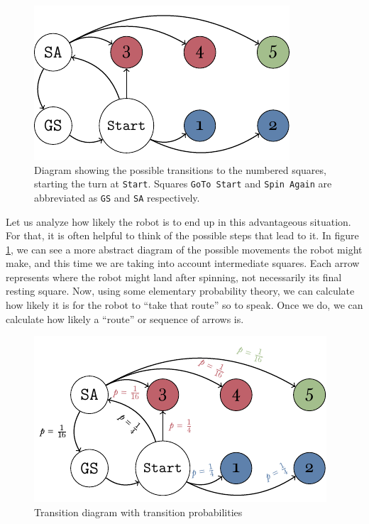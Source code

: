 \begin{figure}
\centering
\includegraphics[width=\textwidth]{img/transicion.pdf}
\caption{Diagram showing the possible transitions to the 
numbered squares, starting the turn at \texttt{Start}. Squares 
\texttt{GoTo Start} and \texttt{Spin Again} are abbreviated as 
\texttt{GS} and \texttt{SA} respectively.}
\label{fig:markov-start}
\end{figure}

Let us analyze how likely the robot is to end up in this advantageous situation.
For that, it is often helpful to think of the possible steps that lead to it. In
figure \ref{fig:markov-start}, we can see a more abstract diagram of the
possible movements the robot might make, and this time we are taking into
account intermediate squares. Each arrow represents where the robot might land
after spinning, not necessarily its final resting square. Now, using some
elementary probability theory, we can calculate how likely it is for the robot
to ``take that route'' so to speak. Once we do, we can calculate how likely a
``route'' or sequence of arrows is.

\begin{figure}[h]
	\centering
	\includegraphics[width=\textwidth]{img/transicion-markov.pdf}
	\caption{Transition diagram with transition probabilities}
	\label{fig:annotated-markov-start}
\end{figure}

